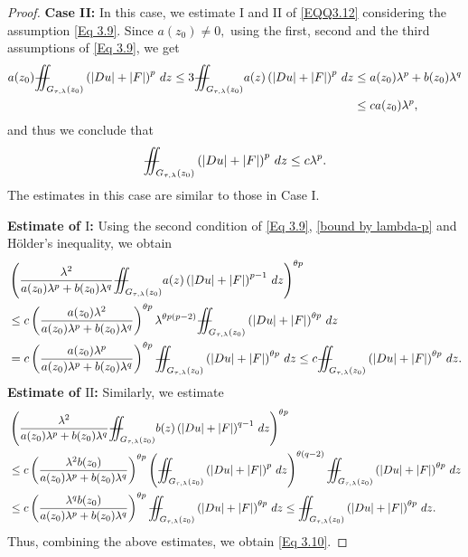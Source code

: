 \documentclass[11pt,oneside, english,reqno,twoside a4paper]{amsart}
\theoremstyle{definition}
\numberwithin{theorem}{section}
\numberwithin{equation}{section}
\newcommand{\iintss}{{\int\hspace{-0.28cm}\int}}
\newcommand{ \miints }{{\iintss\hspace{-0.56cm} -\hspace{-0.15cm}-}}
\newcommand{\miint}[1]{{\miints_{\hspace{-0.13cm}#1}}}
\begin{document}
\begin{proof}
\noindent\textbf{Case II:} In this case, we estimate $\mathrm{I}$ and $\mathrm{II}$ of \eqref{EQQ3.12} considering the assumption \eqref{Eq 3.9}. Since $a(z_0)\neq 0,$ using the first, second and the third assumptions of \eqref{Eq 3.9}, we get
\begin{align*}
    a(z_0)\miint{G_{\tau, \lambda}(z_0)}\left(|Du|+|F|\right)^p\,dz\leq 3 \miint{G_{\tau, \lambda}(z_0)}a(z)\left(|Du|+|F|\right)^p\,dz&\leq a(z_0)\lambda^p+b(z_0)\lambda^q\\&\leq c a(z_0)\lambda^p,
\end{align*}
and thus we conclude that
\begin{align}\label{bound by lambda-p}
    \miint{G_{\tau, \lambda}(z_0)}\left(|Du|+|F|\right)^p\,dz \leq c \lambda^p.
\end{align}
The estimates in this case are similar to those in Case I.

\noindent \textbf{Estimate of $\mathrm{I}$:} Using the second condition of \eqref{Eq 3.9}, \eqref{bound by lambda-p} and H\"{o}lder's inequality, we obtain
\begin{align*}
    &\left(\frac{\lambda^2}{a(z_0)\lambda^p+b(z_0)\lambda^q}\miint{G_{\tau, \lambda}(z_0)}a(z)\left(|Du|+|F|\right)^{p-1}\,dz\right)^{\theta p}\\
    & \leq c \left(\frac{a(z_0)\lambda^2}{a(z_0)\lambda^p+b(z_0)\lambda^q}\right)^{\theta p}\lambda^{\theta p (p-2)} \miint{G_{\tau, \lambda}(z_0)}\left(|Du|+|F|\right)^{\theta p}\, dz\\
    &=c\left(\frac{a(z_0)\lambda^p}{a(z_0)\lambda^p+b(z_0)\lambda^q}\right)^{\theta p} \miint{G_{\tau, \lambda}(z_0)}\left(|Du|+|F|\right)^{\theta p}\, dz \leq c\miint{G_{\tau, \lambda}(z_0)}\left(|Du|+|F|\right)^{\theta p}\, dz.
\end{align*}
\textbf{Estimate of $\mathrm{II}$:} Similarly, we estimate
\begin{align*}
 &\left(\frac{\lambda^2}{a(z_0)\lambda^p+b(z_0)\lambda^q}\miint{G_{\tau, \lambda}(z_0)}b(z)\left(|Du|+|F|\right)^{q-1}\,dz\right)^{\theta p}\\
 &\leq c \left(\frac{\lambda^2 b(z_0)}{a(z_0)\lambda^p+b(z_0)\lambda^q}\right)^{\theta p}\left(\miint{G_{\tau, \lambda}(z_0)}\left(|Du|+|F|\right)^{p}\,dz\right)^{\theta (q-2)} \miint{G_{\tau, \lambda}(z_0)}\left(|Du|+|F|\right)^{\theta p}\,dz\\
 &\leq c \left(\frac{\lambda^q b(z_0)}{a(z_0)\lambda^p+b(z_0)\lambda^q}\right)^{\theta p} \miint{G_{\tau, \lambda}(z_0)}\left(|Du|+|F|\right)^{\theta p}\,dz \leq \miint{G_{\tau, \lambda}(z_0)}\left(|Du|+|F|\right)^{\theta p}\,dz.
\end{align*}
Thus, combining the above estimates, we obtain \eqref{Eq 3.10}.


\end{proof}
\end{document}
